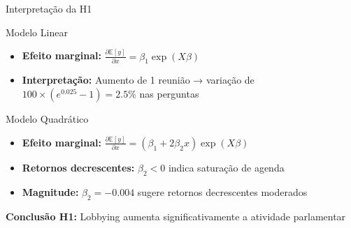 \documentclass[aspectratio=169]{beamer}
\begin{document}
\begin{frame}{Interpretação da H1}
\begin{block}{Modelo Linear}
\begin{itemize}
\item \textbf{Efeito marginal:} $\frac{\partial \mathbb{E}[y]}{\partial x} = \beta_1 \exp(X\beta)$
\item \textbf{Interpretação:} Aumento de 1 reunião → variação de $100 \times (e^{0.025} - 1) = 2.5\%$ nas perguntas
\end{itemize}
\end{block}

\begin{block}{Modelo Quadrático}
\begin{itemize}
\item \textbf{Efeito marginal:} $\frac{\partial \mathbb{E}[y]}{\partial x} = (\beta_1 + 2\beta_2 x) \exp(X\beta)$
\item \textbf{Retornos decrescentes:} $\beta_2 < 0$ indica saturação de agenda
\item \textbf{Magnitude:} $\beta_2 = -0.004$ sugere retornos decrescentes moderados
\end{itemize}
\end{block}

\textbf{Conclusão H1:} Lobbying aumenta significativamente a atividade parlamentar
\end{frame}
\end{document}
